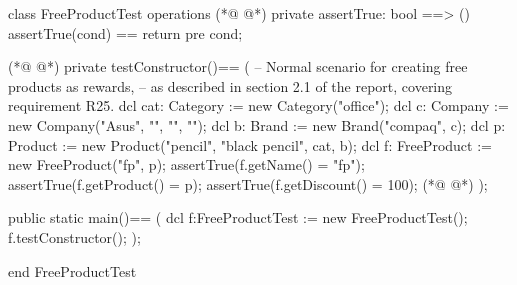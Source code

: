 \begin{vdmpp}[breaklines=true]
class FreeProductTest
 operations
(*@
\label{assertTrue:3}
@*)
  private assertTrue: bool ==> ()
    assertTrue(cond) == return
    pre cond;
    
(*@
\label{testConstructor:7}
@*)
  private testConstructor()==
  (
    -- Normal scenario for creating free products as rewards,
     -- as described in section 2.1 of the report, covering requirement R25.
    dcl cat: Category := new Category("office");
   dcl c: Company := new Company("Asus", "", "", "");
   dcl b: Brand := new Brand("compaq", c);
    dcl p: Product := new Product("pencil", "black pencil", cat, b);
   dcl f: FreeProduct := new FreeProduct("fp", p);
   assertTrue(f.getName() = "fp");
   assertTrue(f.getProduct() = p);
   assertTrue(f.getDiscount() = 100);
(*@
\label{main:19}
@*)
  );
 
  public static main()==
    (
   dcl f:FreeProductTest := new FreeProductTest();
   f.testConstructor();
    );

end FreeProductTest
\end{vdmpp}
